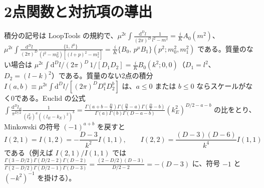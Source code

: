 \documentclass[a4paper,10pt]{ltjsarticle}
\newcommand{\dd}{\mathrm{d}}
\begin{document}
\section{2点関数と対抗項の導出}\label{app:ren}

積分の記号は LoopTools の規約で、$\mu^{2\epsilon}\int\frac{\dd^Dl}{(2\pi)^D}\frac{1}{l^2-m^2}=\frac iKA_0(m^2)$、$\mu^{2\epsilon}\int\frac{\dd^Dl}{(2\pi)^D}\frac{\{1,\,l^\mu\}}{(l^2-m_0^2)[(l+p)^2-m_1^2]}=\frac iK\{B_0,\,p^\mu B_1\}(p^2;m_0^2,m_1^2)$ である。質量のない場合は $\mu^{2\epsilon}\int\dd^Dl/(2\pi)^D\,1/[D_1D_2]=\frac iKB_0(k^2;0,0)$（$D_1=l^2$、$D_2=(l-k)^2$）である。質量のない2点の積分 $I(a,b)\equiv\mu^{2\epsilon}\int\dd^Dl/[(2\pi)^DD_1^aD_2^b]$ は、$a\le0$ または $b\le0$ ならスケールがなく0である。Euclid の公式 $\int\frac{\dd^Dl_E}{\pi^{D/2}}\frac{1}{(l_E^2)^a((l_E-k_E)^2)^b}=\frac{\Gamma(a+b-\frac D2)\Gamma(\frac D2-a)\Gamma(\frac D2-b)}{\Gamma(a)\Gamma(b)\Gamma(D-a-b)}(k_E^2)^{D/2-a-b}$ の比をとり、Minkowski の符号 $(-1)^{a+b}$ を戻すと
\begin{equation*}
I(2,1)=I(1,2)=-\frac{D-3}{k^2}I(1,1),\qquad I(2,2)=\frac{(D-3)(D-6)}{k^4}I(1,1)
\end{equation*}
である（例えば $I(2,1)/I(1,1)$ では $\frac{\Gamma(3-D/2)\Gamma(D/2-2)\Gamma(D-2)}{\Gamma(2-D/2)\Gamma(D/2-1)\Gamma(D-3)}=\frac{(2-D/2)(D-3)}{D/2-2}=-(D-3)$ に、符号 $-1$ と $(-k^2)^{-1}$ を掛ける）。
\end{document}
